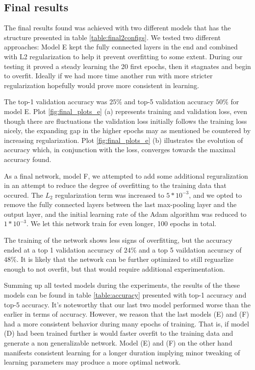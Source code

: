 \documentclass{kthreport}
\begin{document}
\subsection{Final results}


The final results found was achieved with two different models that has the structure presented in table \ref{table:final2configs}. We tested two different approaches: Model E kept the fully connected layers in the end and combined with L2 regularization to help it prevent overfitting to some extent. During our testing it proved a steady learning the 20 first epochs, then it stagnates and begin to overfit. Ideally if we had more time another run with more stricter regularization hopefully would prove more consistent in learning.





The top-1 validation accuracy was $25\%$ and top-5 validation accuracy $50\%$ for model E. Plot \ref{fig:final_plots_e} (a) represents training and validation loss, even though there are fluctuations the validation loss initially follows the training loss nicely, the expanding gap in the higher epochs may as mentioned be countered by increasing regularization. Plot \ref{fig:final_plots_e} (b) illustrates the evolution of accuracy which, in conjunction with the loss, converges towards the maximal accuracy found.


As a final network, model F,  we attempted to add some additional reguralization in an attempt to reduce the degree of overfitting to the training data that occured. The $L_{2}$ regularization term was increased to $5*10^{-3}$, and we opted to remove the fully connected layers between the last max-pooling layer and the output layer, and the initial learning rate of the Adam algorithm was reduced to $1*10^{-3}$. We let this network train for even longer, 100 epochs in total.



The training of the network shows less signs of overfitting, but the accuracy ended at a top 1 validation accuracy of  $24\%$ and a top 5 vaildation accuracy of  $48\%$. It is likely that the network can be further optimized to still reguarlize enough to not overfit, but that would require additional experimentation.


Summing up all tested models during the experiments, the results of the these models can be found in table \ref{table:accuracy} presented with top-1 accuracy and top-5 accuracy. It's noteworthy that our last two model performed worse than the earlier in terms of accuracy. However, we reason that the last models (E) and (F) had a more consistent behavior during many epochs of training. That is, if model (D) had been trained further is would faster overfit to the training data and generate a non generalizable network. Model (E) and (F) on the other hand manifests consistent learning for a longer duration implying minor tweaking of learning parameters may produce a more optimal network. \\
\end{document}
